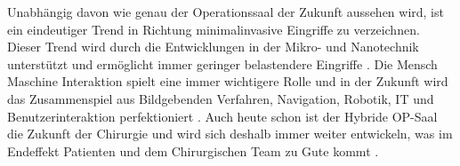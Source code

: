 Unabhängig davon wie genau der Operationssaal der Zukunft aussehen wird, ist ein eindeutiger Trend in Richtung minimalinvasive Eingriffe zu verzeichnen. Dieser Trend wird durch die Entwicklungen in der Mikro- und Nanotechnik unterstützt und ermöglicht immer geringer belastendere Eingriffe \cite{DerDigitaleOperationssaal}.
Die Mensch Maschine Interaktion spielt eine immer wichtigere Rolle und in der Zukunft wird das Zusammenspiel aus Bildgebenden Verfahren, Navigation, Robotik, IT und Benutzerinteraktion perfektioniert \cite{CurrentAndFuture}.
Auch heute schon ist der Hybride OP-Saal die Zukunft der Chirurgie und wird sich deshalb immer weiter entwickeln, was im Endeffekt Patienten und dem Chirurgischen Team zu Gute kommt \cite{Maquet}.


	
	



